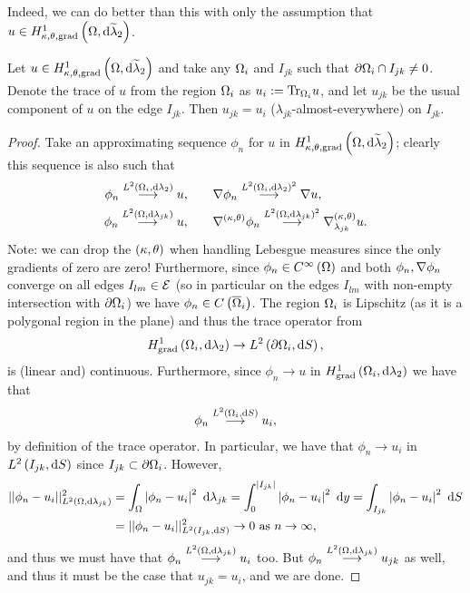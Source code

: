 \documentclass[11pt]{report}
\newcommand{\tlambda}{\widetilde{\lambda}}
\begin{document}
Indeed, we can do better than this with only the assumption that $u\in\ktgradSob{\ddom}{\tlambda_2}$.
\begin{prop}
	Let $u\in\ktgradSob{\ddom}{\tlambda_2}$ and take any $\Omega_i$ and $I_{jk}$ such that $\partial\Omega_i\cap I_{jk}\neq 0$.
	Denote the trace of $u$ from the region $\Omega_i$ as $u_i := \mathrm{Tr}_{\Omega_i}u$, and let $u_{jk}$ be the usual component of $u$ on the edge $I_{jk}$.
	Then $u_{jk} = u_i$ ($\lambda_{jk}$-almost-everywhere) on $I_{jk}$.
\end{prop}
\begin{proof}
	Take an approximating sequence $\phi_n$ for $u$ in $\ktgradSob{\ddom}{\tlambda_2}$; clearly this sequence is also such that
	\begin{align*}
		\phi_n \overset{L^{2}\left( \Omega_i,\mathrm{d}\lambda_2 \right)}{\longrightarrow} u, &\qquad \nabla\phi_n \overset{L^{2}\left( \Omega_i,\mathrm{d}\lambda_2 \right)^2}{\longrightarrow} \nabla u, \\
		 \phi_n \overset{L^{2}\left( \Omega,\mathrm{d}\lambda_{jk} \right)}{\longrightarrow} u, &\qquad \nabla^{\left( \kappa, \theta \right)}\phi_n \overset{L^{2}\left( \Omega,\mathrm{d}\lambda_{jk} \right)^2}{\longrightarrow} \nabla^{\left( \kappa, \theta \right)}_{\lambda_{jk}} u.
	\end{align*}
	Note: we can drop the $\left( \kappa, \theta \right)$ when handling Lebesgue measures since the only gradients of zero are zero!
	Furthermore, since $\phi_n\in C^{\infty}\left( \Omega \right)$ and both $\phi_n,\nabla\phi_n$ converge on all edges $I_{lm}\in\mathcal{E}$ (so in particular on the edges $I_{lm}$ with non-empty intersection with $\partial\Omega_i$) we have $\phi_n\in C\left( \overline{\Omega}_i \right)$.
	The region $\Omega_i$ is Lipschitz (as it is a polygonal region in the plane) and thus the trace operator from 
	\begin{align*}
		H^1_\mathrm{grad}\left( \Omega_i, \mathrm{d}\lambda_2 \right) \rightarrow L^{2}\left( \partial\Omega_i,\mathrm{d}S \right),
	\end{align*}
	is (linear and) continuous.
	Furthermore, since $\phi_n \rightarrow u$ in $H^1_\mathrm{grad}\left( \Omega_i, \mathrm{d}\lambda_2 \right)$ we have that
	\begin{align*}
		\phi_n \overset{L^{2}\left( \Omega_i,\mathrm{d}S \right)}{\longrightarrow} u_i,
	\end{align*}
	by definition of the trace operator.
	In particular, we have that $\phi_n \rightarrow u_i$ in $L^{2}\left( I_{jk},\mathrm{d}S \right)$ since $I_{jk}\subset\partial\Omega_i$.
	However,
	\begin{align*}
		\lvert\lvert \phi_n - u_i \rvert\rvert^2_{L^{2}\left( \Omega,\mathrm{d}\lambda_{jk} \right)}
		&= \int_{\Omega}\left\lvert \phi_n - u_i \right\rvert^2 \ \mathrm{d}\lambda_{jk}
		= \int_0^{\left\lvert I_{jk} \right\rvert} \left\lvert \phi_n - u_i \right\rvert^2 \ \mathrm{d} y
		= \int_{I_{jk}}\left\lvert \phi_n - u_i \right\rvert^2 \ \mathrm{d}S \\
		&= \lvert\lvert \phi_n - u_i \rvert\rvert^2_{L^{2}\left( I_{jk},\mathrm{d}S \right)}
		\rightarrow 0 \ \text{as} \ n \rightarrow\infty,
	\end{align*}
	and thus we must have that $\phi_n\overset{L^{2}\left( \Omega,\mathrm{d}\lambda_{jk} \right)}{\longrightarrow}u_i$ too.
	But $\phi_n\overset{L^{2}\left( \Omega,\mathrm{d}\lambda_{jk} \right)}{\longrightarrow}u_{jk}$ as well, and thus it must be the case that $u_{jk} = u_i$, and we are done.
\end{proof}
\end{document}

